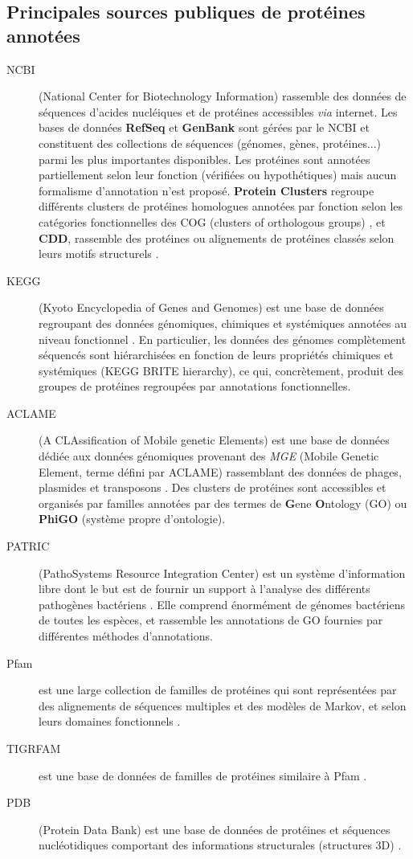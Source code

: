 \subsection{Principales sources publiques de protéines annotées}
    \begin{description}
     \item[NCBI] (National Center for Biotechnology Information) rassemble des données de séquences d'acides nucléiques et de protéines accessibles \textit{via} internet. Les bases de données \textbf{RefSeq} \citep{pruitt2007ncbi} et \textbf{GenBank} \citep{benson2008genbank} sont gérées par le NCBI et constituent des collections de séquences (génomes, gènes, protéines...) parmi les plus importantes disponibles. Les protéines sont annotées partiellement selon leur fonction (vérifiées ou hypothétiques) mais aucun formalisme d'annotation n'est proposé. \textbf{Protein Clusters} regroupe différents clusters de protéines homologues annotées par fonction selon les catégories fonctionnelles des COG (clusters of orthologous groups) \citep{mcentyre2003clusters}, et \textbf{CDD}, rassemble des protéines ou alignements de protéines classés selon leurs motifs structurels \citep{marchler2007cdd}.
      \item[KEGG]  (Kyoto Encyclopedia of Genes and Genomes) est une base de données regroupant des données génomiques, chimiques et systémiques annotées au niveau fonctionnel \citep{Kanehisa2012}. En particulier, les données des génomes complètement séquencés sont hiérarchisées en fonction de leurs propriétés chimiques et systémiques (KEGG BRITE hierarchy), ce qui, concrètement, produit des groupes de protéines regroupées par annotations fonctionnelles.
	\item[ACLAME] (A CLAssification of Mobile genetic Elements) est une base de données dédiée aux données génomiques provenant des \textit{MGE} (Mobile Genetic Element, terme défini par ACLAME) rassemblant des données de phages, plasmides et transposons \citep{leplae2010aclame}. Des clusters de protéines sont accessibles et organisés par familles annotées par des termes de \textbf{G}ene \textbf{O}ntology (GO) \citep{gene2000gene} ou \textbf{PhiGO} (système propre d'ontologie).
	\item[PATRIC]  (PathoSystems Resource Integration Center) est un système d'information libre dont le but est de fournir un support à l'analyse des différents pathogènes bactériens \citep{wattam2014patric}. Elle comprend énormément de génomes bactériens de toutes les espèces, et rassemble les annotations de GO fournies par différentes méthodes d'annotations.
	\item[Pfam] est une large collection de familles de protéines qui sont représentées par des alignements de séquences multiples et des modèles de Markov, et selon leurs domaines fonctionnels \citep{finn2014pfam}.
	\item[TIGRFAM] est une base de données de familles de protéines similaire à Pfam \citep{haft2003tigrfams}.
	\item[PDB] (Protein Data Bank) est une base de données de protéines et séquences nucléotidiques comportant des informations structurales (structures 3D) \citep{rose2013rcsb}.
\end{description}


